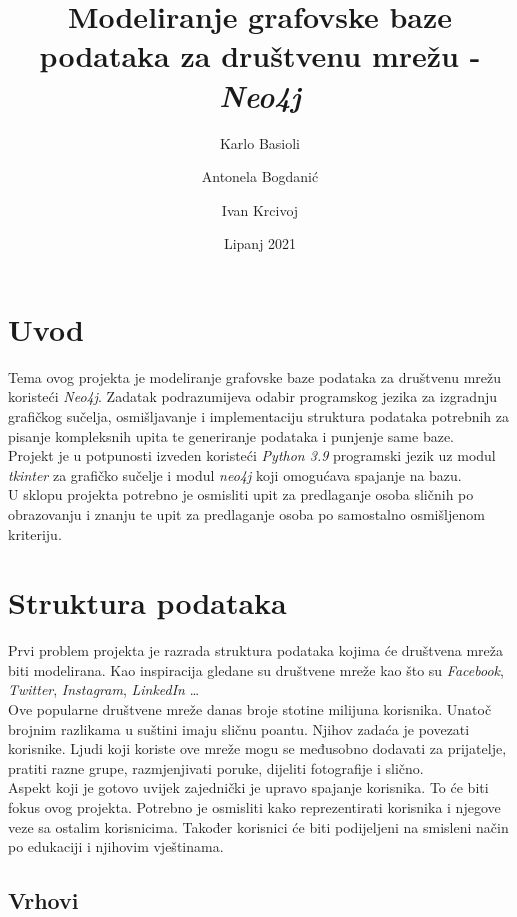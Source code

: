 \documentclass[titlepage, 12pt]{scrartcl}
\title{Modeliranje grafovske baze podataka za društvenu mrežu - \emph{Neo4j}}
\author{Karlo Basioli \and 
        Antonela Bogdanić \and 
        Ivan Krcivoj }
\date{Lipanj 2021}
\begin{document}
\maketitle

\tableofcontents

\newpage

\section{Uvod}
Tema ovog projekta je modeliranje grafovske baze podataka za društvenu mrežu koristeći \emph{Neo4j}. Zadatak podrazumijeva odabir programskog jezika za izgradnju grafičkog sučelja, osmišljavanje i implementaciju struktura podataka potrebnih za pisanje kompleksnih upita te generiranje podataka i punjenje same baze. \\
Projekt je u potpunosti izveden koristeći \emph{Python 3.9} programski jezik uz modul \emph{tkinter} za grafičko sučelje i modul \emph{neo4j} koji omogućava spajanje na bazu. \\
U sklopu projekta potrebno je osmisliti upit za predlaganje osoba sličnih po obrazovanju i znanju te upit za predlaganje osoba po samostalno osmišljenom kriteriju.

\newpage
\section{Struktura podataka}
Prvi problem projekta je razrada struktura podataka kojima će društvena mreža biti modelirana. Kao inspiracija gledane su društvene mreže kao što su \emph{Facebook}, \emph{Twitter}, \emph{Instagram}, \emph{LinkedIn} \dots \\
Ove popularne društvene mreže danas broje stotine milijuna korisnika. Unatoč brojnim razlikama u suštini imaju sličnu poantu. Njihov zadaća je povezati korisnike. Ljudi koji koriste ove mreže mogu se međusobno dodavati za prijatelje, pratiti razne grupe, razmjenjivati poruke, dijeliti fotografije i slično. \\
Aspekt koji je gotovo uvijek zajednički je upravo spajanje korisnika. To će biti fokus ovog projekta. Potrebno je osmisliti kako reprezentirati korisnika i njegove veze sa ostalim korisnicima. Također korisnici će biti podijeljeni na smisleni način po edukaciji i njihovim vještinama.

\subsection{Vrhovi}
\end{document}
